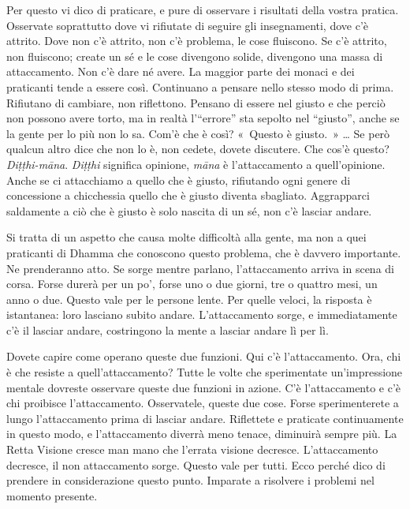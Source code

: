 Per questo vi dico di praticare, e pure di osservare i risultati della
vostra pratica. Osservate soprattutto dove vi rifiutate di seguire gli
insegnamenti, dove c'è attrito. Dove non c'è attrito, non c'è problema,
le cose fluiscono. Se c'è attrito, non fluiscono; create un sé e le cose
divengono solide, divengono una massa di attaccamento. Non c'è dare né
avere. La maggior parte dei monaci e dei praticanti tende a essere così.
Continuano a pensare nello stesso modo di prima. Rifiutano di cambiare,
non riflettono. Pensano di essere nel giusto e che perciò non possono
avere torto, ma in realtà l'``errore'' sta sepolto nel ``giusto'', anche
se la gente per lo più non lo sa. Com'è che è così? «~Questo è giusto.~»
\ldots{} Se però qualcun altro dice che non lo è, non cedete, dovete
discutere. Che cos'è questo? \emph{Diṭṭhi-māna}. \emph{Diṭṭhi} significa
opinione, \emph{māna} è l'attaccamento a quell'opinione. Anche se ci
attacchiamo a quello che è giusto, rifiutando ogni genere di concessione
a chicchessia quello che è giusto diventa sbagliato. Aggrapparci
saldamente a ciò che è giusto è solo nascita di un sé, non c'è lasciar
andare.

Si tratta di un aspetto che causa molte difficoltà alla gente, ma non a
quei praticanti di Dhamma che conoscono questo problema, che è davvero
importante. Ne prenderanno atto. Se sorge mentre parlano,
l'attaccamento arriva in scena di corsa. Forse durerà per un po', forse
uno o due giorni, tre o quattro mesi, un anno o due. Questo vale per le
persone lente. Per quelle veloci, la risposta è istantanea: loro
lasciano subito andare. L'attaccamento sorge, e immediatamente c'è il
lasciar andare, costringono la mente a lasciar andare lì per lì.

Dovete capire come operano queste due funzioni. Qui c'è l'attaccamento.
Ora, chi è che resiste a quell'attaccamento? Tutte le volte che
sperimentate un'impressione mentale dovreste osservare queste due
funzioni in azione. C'è l'attaccamento e c'è chi proibisce
l'attaccamento. Osservatele, queste due cose. Forse sperimenterete a
lungo l'attaccamento prima di lasciar andare. Riflettete e praticate
continuamente in questo modo, e l'attaccamento diverrà meno tenace,
diminuirà sempre più. La Retta Visione cresce man mano che l'errata
visione decresce. L'attaccamento decresce, il non attaccamento sorge.
Questo vale per tutti. Ecco perché dico di prendere in considerazione
questo punto. Imparate a risolvere i problemi nel momento presente.

